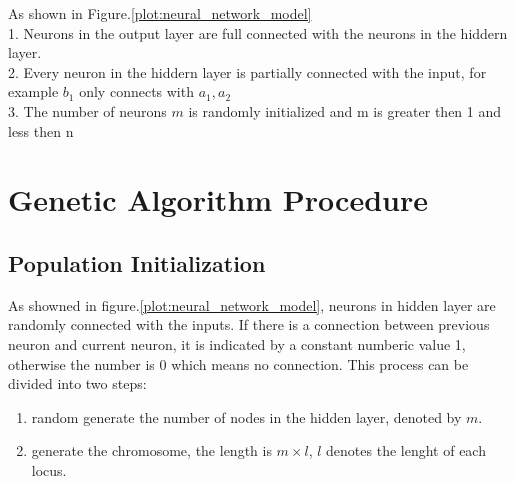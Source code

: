 \documentclass[smallextended]{svjour3}       %
\begin{document}
\begin{multicols}{2}
\begin{center}
\label{plot:neural_network_model}
\end{center}





As shown in Figure.\ref{plot:neural_network_model} \\
1. Neurons in the output layer are full connected with the neurons in the
hiddern layer. \\
2. Every neuron in the hiddern layer is partially connected with the input, for
example $b_1$ only connects with $a_1, a_2$\\ 
3. The number of neurons $m$ is randomly initialized and m is greater then 1 and
less then n \\
\section{Genetic Algorithm Procedure}
\subsection{Population Initialization}
As showned in figure.\ref{plot:neural_network_model}, neurons in hidden layer are
randomly connected with the inputs. If there is a connection between previous
neuron and current neuron, it is indicated by a constant numberic value 1, otherwise the
number is 0 which means no connection. This process can be divided into two
steps:
\begin{enumerate}
	\item random generate the number of nodes in the hidden layer, denoted by $m$.
	\item generate the chromosome, the length is $ m \times l$, $l$ denotes the
		lenght of each locus.
\end{enumerate}


\end{multicols}
\end{document}
